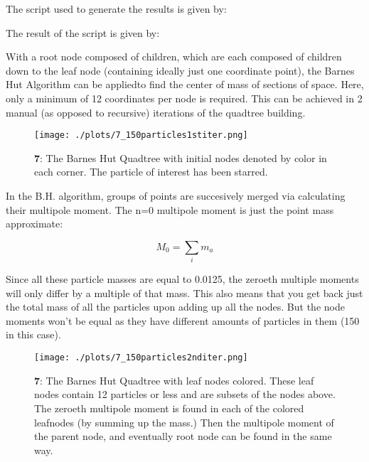 The script used to generate the results is given by:
  


The result of the script is given by:




With a root node composed of children, which are each composed of children down to the leaf node (containing ideally just one coordinate point), the Barnes Hut Algorithm can be appliedto find the center of mass of sections of space. Here, only a minimum of 12 coordinates per node is required. This can be achieved in 2 manual (as opposed to recursive) iterations of the quadtree building.


\begin{figure}[h!]
  \centering
  \texttt{[image: ./plots/7\_150particles1stiter.png]}
  \caption{\textbf{7}: The Barnes Hut Quadtree with initial nodes denoted by color in each corner. The particle of interest has been starred.}
  \label{fig:spatialdensitygrowtht0}
\end{figure}


In the B.H. algorithm, groups of points are succesively merged via calculating their multipole moment. The n=0 multipole moment is just the point mass approximate:

\begin{equation}
  M_0=\sum_i m_a
\end{equation}

Since all these particle masses are equal to 0.0125, the zeroeth multiple moments will only differ by a multiple of that mass. This also means that you get back just the total mass of all the particles upon adding up all the nodes. But the node moments won't be equal as they have different amounts of particles in them (150 in this case).


\begin{figure}[h!]
  \centering
  \texttt{[image: ./plots/7\_150particles2nditer.png]}
  \caption{\textbf{7}: The Barnes Hut Quadtree with leaf nodes colored. These leaf nodes contain 12 particles or less and are subsets of the nodes above. The zeroeth multipole moment is found in each of the colored leafnodes (by summing up the mass.) Then the multipole moment of the parent node, and eventually root node can be found in the same way.}
\end{figure}